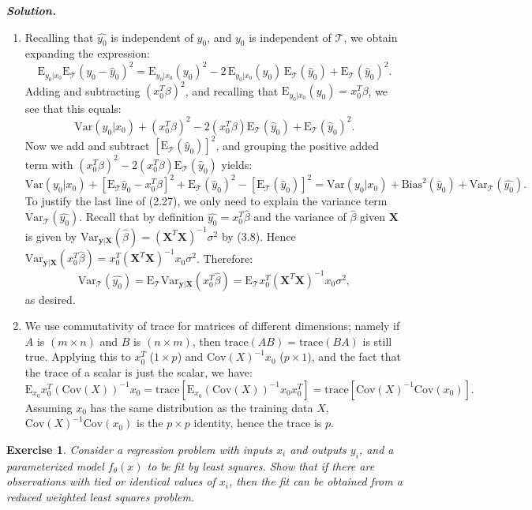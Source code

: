 \documentclass[12pt]{article}
\def\cT{\mathcal{T}}
\def\bX{\textbf{X}}
\def\by{\textbf{y}}
\def\E{\text{E}}
\def\Trace{\text{trace}}
\def\Var{\text{Var}}
\def\Cov{\text{Cov}}
\newtheorem{exercise}{Exercise}[section]
\newenvironment{solution}[1][\it{Solution}]{\textbf{#1. } }{\vspace{.5cm}}
\begin{document}
\begin{solution}
\begin{enumerate}
\item [(a)] Recalling that $\hat{y_0}$ is independent of $y_0$, and $y_0$ is independent of $\cT$, we obtain expanding the expression:
$$\E_{y_0 | x_0} \E_\cT (y_0 - \hat{y}_0)^2 = \E_{y_0 | x_0}  (y_0)^2 - 2\, \E_{y_0 | x_0}  (y_0)\,\E_\cT(\hat{y}_0) + \E_\cT(\hat{y}_0)^2.$$	
Adding and subtracting $(x_0^T \beta)^2$, and recalling that $\E_{y_0 | x_0}  (y_0) = x_0^T \beta$, we see that this equals:
$$\Var(y_0 | x_0) + (x_0^T \beta)^2- 2 (x_0^T \beta)\E_\cT(\hat{y}_0) + \E_\cT(\hat{y}_0)^2.$$
Now we add and subtract $[\E_\cT(\hat{y}_0)]^2$, and grouping the positive added term with $(x_0^T \beta)^2- 2 (x_0^T \beta)\E_\cT(\hat{y}_0)$ yields:
$$\Var(y_0 | x_0) + [\E_\cT \hat{y}_0 - x_0^T \beta]^2 + \E_\cT(\hat{y}_0)^2 - [\E_\cT (\hat{y}_0)]^2 = \Var(y_0 | x_0) + \text{Bias}^2(\hat{y}_0) + \Var_\cT(\hat{y_0}).$$
To justify the last line of (2.27), we only need to explain the variance term $\Var_\cT(\hat{y_0})$. Recall that by definition $\hat{y_0} = x_0^T \hat{\beta}$ and the variance of $\hat{\beta}$ given $\bX$ is given by $\Var_{\by | \bX}(\hat{\beta}) = (\bX^T \bX)^{-1} \sigma^2$ by (3.8). Hence $\Var_{\by | \bX}(x_0^T\hat{\beta}) = x_0^T(\bX^T \bX)^{-1}x_0 \sigma^2$. Therefore:
$$\Var_{\cT}(\hat{y_0}) = \E_\cT\Var_{\by | \bX}(x_0^T\hat{\beta}) = \E_\cT x_0^T(\bX^T \bX)^{-1}x_0 \sigma^2,$$
as desired.

\item [(b)] We use commutativity of trace for matrices of different dimensions; namely if $A$ is $(m \times n)$ and $B$ is $(n \times m)$, then $\Trace(AB) = \Trace(BA)$ is still true. Applying this to $x_0^T$ ($1 \times p$) and $\Cov(X)^{-1}x_0$ ($p \times 1$), and the fact that the trace of a scalar is just the scalar, we have:
$$\E_{x_0} x_0^T(\Cov(X))^{-1}x_0 = \Trace[\E_{x_0}(\Cov(X))^{-1}x_0x_0^T] = \Trace[\Cov(X)^{-1} \Cov(x_0)]. $$
Assuming $x_0$ has the same distribution as the training data $X$, $\Cov(X)^{-1} \Cov(x_0)$ is the $p \times p$ identity, hence the trace is $p$.
\end{enumerate}
\end{solution}


\begin{exercise}
Consider a regression problem with inputs $x_i$ and outputs $y_i$, and a parameterized model $f_\theta(x)$ to be fit by least squares. Show that if there are observations with tied or identical values of $x_i$, then the fit can be obtained from a reduced weighted least squares problem.	
\end{exercise}
\end{document}
